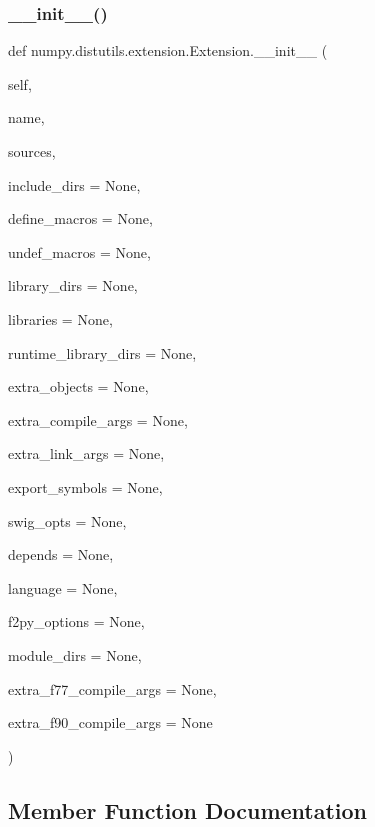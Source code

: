 \subsubsection{\texorpdfstring{\+\_\+\+\_\+init\+\_\+\+\_\+()}{\_\_init\_\_()}}
{\footnotesize\ttfamily def numpy.\+distutils.\+extension.\+Extension.\+\_\+\+\_\+init\+\_\+\+\_\+ (\begin{DoxyParamCaption}\item[{}]{self,  }\item[{}]{name,  }\item[{}]{sources,  }\item[{}]{include\+\_\+dirs = {\ttfamily None},  }\item[{}]{define\+\_\+macros = {\ttfamily None},  }\item[{}]{undef\+\_\+macros = {\ttfamily None},  }\item[{}]{library\+\_\+dirs = {\ttfamily None},  }\item[{}]{libraries = {\ttfamily None},  }\item[{}]{runtime\+\_\+library\+\_\+dirs = {\ttfamily None},  }\item[{}]{extra\+\_\+objects = {\ttfamily None},  }\item[{}]{extra\+\_\+compile\+\_\+args = {\ttfamily None},  }\item[{}]{extra\+\_\+link\+\_\+args = {\ttfamily None},  }\item[{}]{export\+\_\+symbols = {\ttfamily None},  }\item[{}]{swig\+\_\+opts = {\ttfamily None},  }\item[{}]{depends = {\ttfamily None},  }\item[{}]{language = {\ttfamily None},  }\item[{}]{f2py\+\_\+options = {\ttfamily None},  }\item[{}]{module\+\_\+dirs = {\ttfamily None},  }\item[{}]{extra\+\_\+f77\+\_\+compile\+\_\+args = {\ttfamily None},  }\item[{}]{extra\+\_\+f90\+\_\+compile\+\_\+args = {\ttfamily None} }\end{DoxyParamCaption})}



\subsection{Member Function Documentation}
\mbox{\label{classnumpy_1_1distutils_1_1extension_1_1Extension_a1dbf98fe50e3e9b1c0d09086e8dcbecb}} 
